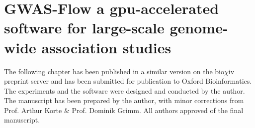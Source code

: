
\chapter{GWAS-Flow a gpu-accelerated software for large-scale genome-wide association studies}

\label{Chapter3} %


The following chapter has been published in a similar version on the bio$\chi$iv preprint server
\cite{Freudenthal_2019} and has been submitted for publication to Oxford Bioinformatics. The experiments and
the software were designed and conducted by the author. The manuscript has been prepared by the author, with
minor corrections from Prof. Arthur Korte \& Prof. Dominik Grimm. All authors approved of the final
manuscript. 


